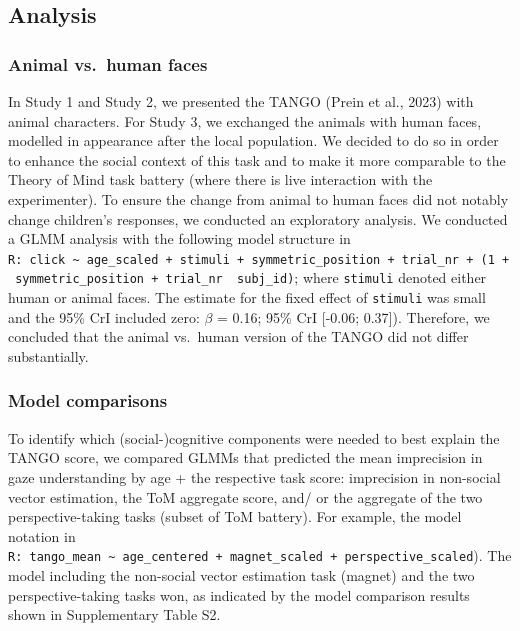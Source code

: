 \documentclass[
  man,floatsintext]{apa7}
\begin{document}
\subsection{Analysis}\label{analysis-2}

\subsubsection{Animal vs.~human faces}\label{animal-vs.-human-faces}

In Study 1 and Study 2, we presented the TANGO (Prein et al., 2023) with animal characters. For Study 3, we exchanged the animals with human faces, modelled in appearance after the local population. We decided to do so in order to enhance the social context of this task and to make it more comparable to the Theory of Mind task battery (where there is live interaction with the experimenter). To ensure the change from animal to human faces did not notably change children's responses, we conducted an exploratory analysis. We conducted a GLMM analysis with the following model structure in \texttt{R:\ click\ \textasciitilde{}\ age\_scaled\ +\ stimuli\ +\ symmetric\_position\ +\ trial\_nr\ +\ (1\ +\ symmetric\_position\ +\ trial\_nr\ \textbar{}\ subj\_id)}; where \texttt{stimuli} denoted either human or animal faces. The estimate for the fixed effect of \texttt{stimuli} was small and the 95\% CrI included zero: \(\beta\) = 0.16; 95\% CrI {[}-0.06; 0.37{]}). Therefore, we concluded that the animal vs.~human version of the TANGO did not differ substantially.

\subsubsection{Model comparisons}\label{model-comparisons}

To identify which (social-)cognitive components were needed to best explain the TANGO score, we compared GLMMs that predicted the mean imprecision in gaze understanding by age + the respective task score: imprecision in non-social vector estimation, the ToM aggregate score, and/ or the aggregate of the two perspective-taking tasks (subset of ToM battery). For example, the model notation in \texttt{R:\ tango\_mean\ \textasciitilde{}\ age\_centered\ +\ magnet\_scaled\ +\ perspective\_scaled}). The model including the non-social vector estimation task (magnet) and the two perspective-taking tasks won, as indicated by the model comparison results shown in Supplementary Table S2.
\end{document}
